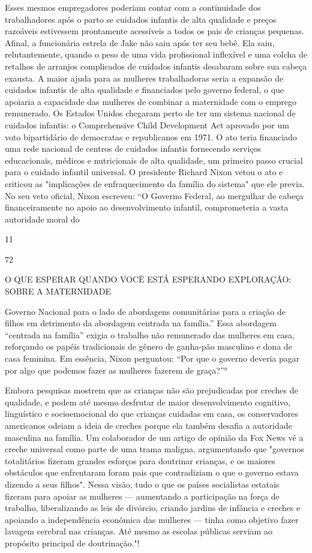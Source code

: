 Esses mesmos empregadores poderiam contar com a continuidade dos trabalhadores após o parto se cuidados infantis de alta qualidade e preços razoáveis ​​estivessem prontamente acessíveis a todos os pais de crianças pequenas. Afinal, a funcionária estrela de Jake não saiu após ter seu bebê. Ela saiu, relutantemente, quando o peso de uma vida profissional inflexível e uma colcha de retalhos de arranjos complicados de cuidados infantis desabaram sobre sua cabeça exausta. A maior ajuda para as mulheres trabalhadoras seria a expansão de cuidados infantis de alta qualidade e financiados pelo governo federal, o que apoiaria a capacidade das mulheres de combinar a maternidade com o emprego remunerado. Os Estados Unidos chegaram perto de ter um sistema nacional de cuidados infantis: o Comprehensive Child Development Act aprovado por um voto bipartidário de democratas e republicanos em 1971. O ato teria financiado uma rede nacional de centros de cuidados infantis fornecendo serviços educacionais, médicos e nutricionais de alta qualidade, um primeiro passo crucial para o cuidado infantil universal. O presidente Richard Nixon vetou o ato e criticou as "implicações de enfraquecimento da família do sistema" que ele previa. No seu veto oficial, Nixon escreveu: “O Governo Federal, ao mergulhar de cabeça financeiramente no apoio ao desenvolvimento infantil, comprometeria a vasta autoridade moral do
 \par 
11
 \par 
72
 \par 
O QUE ESPERAR QUANDO VOCÊ ESTÁ ESPERANDO EXPLORAÇÃO: SOBRE A MATERNIDADE
 \par 
Governo Nacional para o lado de abordagens comunitárias para a criação de filhos em detrimento da abordagem centrada na família.” Essa abordagem “centrada na família” exigia o trabalho não remunerado das mulheres em casa, reforçando os papéis tradicionais de gênero de ganha-pão masculino e dona de casa feminina. Em essência, Nixon perguntou: “Por que o governo deveria pagar por algo que podemos fazer as mulheres fazerem de graça?”°
 \par 
Embora pesquisas mostrem que as crianças não são prejudicadas por creches de qualidade, e podem até mesmo desfrutar de maior desenvolvimento cognitivo, linguístico e socioemocional do que crianças cuidadas em casa, os conservadores americanos odeiam a ideia de creches porque ela também desafia a autoridade masculina na família. Um colaborador de um artigo de opinião da Fox News vê a creche universal como parte de uma trama maligna, argumentando que "governos totalitários fizeram grandes esforços para doutrinar crianças, e os maiores obstáculos que enfrentaram foram pais que contradiziam o que o governo estava dizendo a seus filhos". Nessa visão, tudo o que os países socialistas estatais fizeram para apoiar as mulheres — aumentando a participação na força de trabalho, liberalizando as leis de divórcio, criando jardins de infância e creches e apoiando a independência econômica das mulheres — tinha como objetivo fazer lavagem cerebral nas crianças. Até mesmo as escolas públicas serviam ao propósito principal de doutrinação."!
